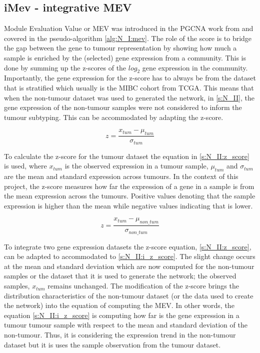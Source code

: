 \subsection*{iMev - integrative MEV} \label{s:N_II:iMEV}

Module Evaluation Value or MEV was introduced in the PGCNA work from \citet{Care2019-ij} and covered in the pseudo-algorithm \cref{alg:N_I:mev}. The role of the score is to bridge the gap between the gene to tumour representation by showing how much a sample is enriched by the (selected) gene expression from a community. This is done by summing up the z-scores of the $log_2$ gene expression in the community. Importantly, the gene expression  for the z-score has to always be from the dataset that is stratified which usually is the MIBC cohort from TCGA. This means that when the non-tumour dataset was used to generated the network, in \cref{s:N_II}, the gene expression of the non-tumour samples were not considered to inform the tumour subtyping. This can be accommodated by adapting the z-score.

\begin{equation} \label{s:N_II:z_score}
z = \frac{x_{tum} - \mu_{tum}}{\sigma_{tum}}
\end{equation}

To calculate the z-score for the tumour dataset the equation in \cref{s:N_II:z_score} is used, where $x_{tum}$ is the observed expression in a tumour sample, $\mu_{tum}$ and $\sigma_{tum}$ are the mean and standard expression across tumours. In the context of this project, the z-score measures how far the expression of a gene in a sample is from the mean expression across the tumours. Positive values denoting that the sample expression is higher than the mean while negative values indicating that is lower.


\begin{equation} \label{s:N_II:i_z_score}
z = \frac{x_{tum} - \mu_{non\_tum}}{\sigma_{non\_tum}}
\end{equation}

To integrate two gene expression datasets the z-score equation, \cref{s:N_II:z_score}, can be adapted to accommodated to \cref{s:N_II:i_z_score}. The slight change occurs at the mean and standard deviation which are now computed for the non-tumour samples or the dataset that it is used to generate the network; the observed samples, $x_{tum}$ remains unchanged. The modification of the z-score brings the distribution characteristics of the non-tumour dataset (or the data used to create the network) into the equation of computing the MEV. In other words, the equation \cref{s:N_II:i_z_score} is computing how far is the gene expression in a tumour tumour sample with respect to the mean and standard deviation of the non-tumour. Thus, it is considering the expression trend in the non-tumour dataset but it is uses the sample observation from the tumour dataset.


